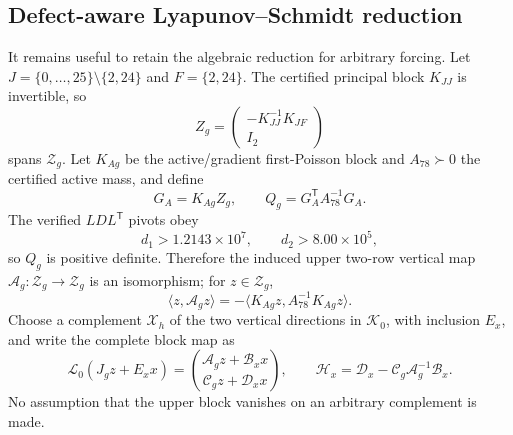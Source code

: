 \documentclass[11pt]{article}
\numberwithin{equation}{section}
\theoremstyle{definition}
\theoremstyle{remark}
\begin{document}
\subsection{Defect-aware Lyapunov--Schmidt reduction}
It remains useful to retain the algebraic reduction for arbitrary forcing.
Let $J=\{0,\ldots,25\}\setminus\{2,24\}$ and $F=\{2,24\}$.  The certified
principal block $K_{JJ}$ is invertible, so
\begin{equation}
 Z_g=\begin{pmatrix}-K_{JJ}^{-1}K_{JF}\\ I_2\end{pmatrix}
 \label{eq:supp-exact-Zg-basis}
\end{equation}
spans $\mathcal Z_g$.  Let $K_{Ag}$ be the active/gradient first-Poisson
block and $A_{78}\succ0$ the certified active mass, and define
\begin{equation}
 G_A=K_{Ag}Z_g,
 \qquad
 Q_g=G_A^{\mathsf T}A_{78}^{-1}G_A.
 \label{eq:supp-exact-Qg}
\end{equation}
The verified $LDL^{\mathsf T}$ pivots obey
\begin{equation}
 d_1>1.2143\times10^7,
 \qquad
 d_2>8.00\times10^5,
 \label{eq:supp-exact-Qg-pivots}
\end{equation}
so $Q_g$ is positive definite.  Therefore the induced upper two-row vertical
map $\mathcal A_g:\mathcal Z_g\to\mathcal Z_g$ is an isomorphism; for
$z\in\mathcal Z_g$,
\begin{equation}
 \langle z,\mathcal A_gz\rangle
 =-\langle K_{Ag}z,A_{78}^{-1}K_{Ag}z\rangle.
 \label{eq:supp-exact-Ag-form}
\end{equation}
Choose a complement $\mathcal X_h$ of the two vertical directions in
$\mathcal K_0$, with inclusion $E_x$, and write the complete block map as
\begin{equation}
 \mathcal L_0(J_gz+E_xx)=
 \binom{\mathcal A_gz+\mathcal B_xx}
       {\mathcal C_gz+\mathcal D_xx},\qquad
 \mathcal H_x=\mathcal D_x-\mathcal C_g\mathcal A_g^{-1}\mathcal B_x.
 \label{eq:supp-exact-complete-LS-blocks}
\end{equation}
No assumption that the upper block vanishes on an arbitrary complement is
made.
\end{document}
